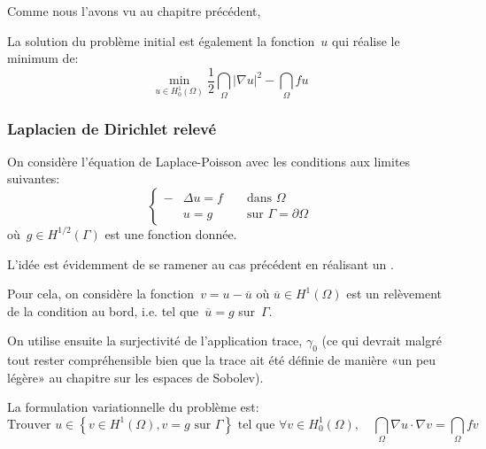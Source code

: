 \medskip
Comme nous l'avons vu au chapitre précédent, 

La solution du problème initial est également la fonction~$u$ qui réalise le minimum de:
\begin{equation}
\min_{u\in H^1_0(\Omega)} \dfrac12\dint_\Omega |\nabla u|^2-\dint_\Omega fu
\end{equation}

\medskip
\subsubsection{Laplacien de Dirichlet relevé}
On considère l'équation de Laplace-Poisson avec les conditions aux limites suivantes:
\begin{equation}\left\{\begin{aligned}
-&\Delta u=f &&\text{ dans } \Omega\\
&u=g &&\text{ sur } \Gamma=\partial\Omega
\end{aligned}
\right.
\end{equation}
où~$g\in H^{1/2}(\Gamma)$ est une fonction donnée.

\medskip
L'idée est évidemment de se ramener au cas précédent en réalisant un .

Pour cela, on considère la fonction~$v = u - \overline{u}$ où $\overline{u}\in H^1(\Omega)$ est un relèvement de la condition au bord, i.e. tel que~$\overline{u}=g$ sur~$\Gamma$.

On utilise ensuite la surjectivité de l'application trace, $\gamma_0$ (ce qui devrait malgré tout rester compréhensible bien que la trace ait été définie de manière «un peu légère» au chapitre sur les espaces de Sobolev).

\medskip
La formulation variationnelle du problème est:
\begin{equation}
\text{Trouver } u \in \left\{ v\in H^1(\Omega), v=g \text{ sur } \Gamma\right\}
 \text{ tel que }
\forall v\in H^1_0(\Omega),
\quad\dint_\Omega \nabla u\cdot\nabla v = \dint_\Omega fv
\end{equation}

